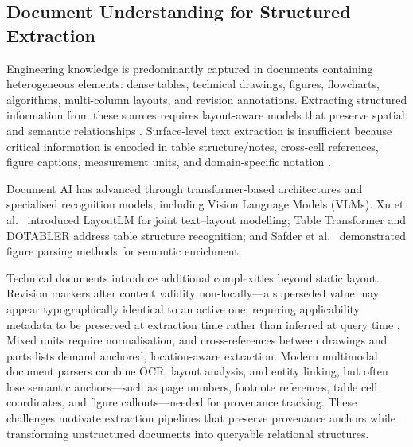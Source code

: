\documentclass[largeformat]{interact}
\begin{document}
\subsection{Document Understanding for Structured Extraction}
\label{sec:document_understanding}
Engineering knowledge is predominantly captured in documents containing heterogeneous elements: dense tables, technical drawings, figures, flowcharts, algorithms, multi-column layouts, and revision annotations. Extracting structured information from these sources requires layout-aware models that preserve spatial and semantic relationships \cite{zhang2025doc}. Surface-level text extraction is insufficient because critical information is encoded in table structure/notes, cross-cell references, figure captions, measurement units, and domain-specific notation \cite{guo2026dtbench, foppiano2019}.

Document AI has advanced through transformer-based architectures and specialised recognition models, including Vision Language Models (VLMs). Xu et al.~\cite{xu2020} introduced LayoutLM for joint text--layout modelling; Table Transformer \cite{lin2022tsrformer, nassar2022tableformer} and  DOTABLER \cite{li2025surface} address table structure recognition; and Safder et al.~\cite{safder2022} demonstrated figure parsing methods for semantic enrichment.

Technical documents introduce additional complexities beyond static layout. Revision markers alter content validity non-locally---a superseded value may appear typographically identical to an active one, requiring applicability metadata to be preserved at extraction time rather than inferred at query time \cite{xie2026agentframework}. Mixed units require normalisation, and cross-references between drawings and parts lists demand anchored, location-aware extraction. Modern multimodal document parsers combine OCR, layout analysis, and entity linking, but often lose semantic anchors---such as page numbers, footnote references, table cell coordinates, and figure callouts---needed for provenance tracking. These challenges motivate extraction pipelines that preserve provenance anchors while transforming unstructured documents into queryable relational structures.

\end{document}
